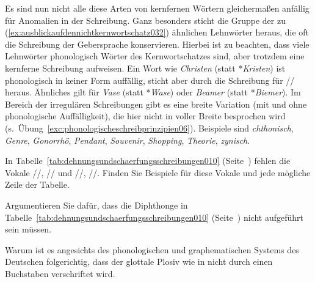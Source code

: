 Es sind nun nicht alle diese Arten von kernfernen Wörtern gleichermaßen anfällig für Anomalien in der Schreibung.
Ganz besonders sticht die Gruppe der zu (\ref{ex:ausblickaufdennichtkernwortschatz032}) ähnlichen Lehnwörter heraus, die oft die Schreibung der Gebersprache konservieren.
Hierbei ist zu beachten, dass viele Lehnwörter phonologisch Wörter des Kernwortschatzes sind, aber trotzdem eine kernferne Schreibung aufweisen.
Ein Wort wie \textit{Christen} (statt *\textit{Kristen}) ist phonologisch in keiner Form auffällig, sticht aber durch die Schreibung \textipa{[chr]} für // heraus.
Ähnliches gilt für \textit{Vase} (statt *\textit{Wase}) oder \textit{Beamer} (statt *\textit{Biemer}).
Im Bereich der irregulären Schreibungen gibt es eine breite Variation (mit und ohne phonologische Auffälligkeit), die hier nicht in voller Breite besprochen wird (s.\ Übung~\ref{exc:phonologischeschreibprinzipien06}).
Beispiele sind \textit{chthonisch}, \textit{Genre}, \textit{Gonorrhö}, \textit{Pendant}, \textit{Souvenir}, \textit{Shopping}, \textit{Theorie}, \textit{zynisch}.


\Uebungen

 \label{exc:phonologischeschreibprinzipien01} In Tabelle~\ref{tab:dehnungsundschaerfungsschreibungen010} (Seite~\pageref{tab:dehnungsundschaerfungsschreibungen010}) fehlen die Vokale //, // und /\textipa{\o}/, /\textipa{\oe}/.
Finden Sie Beispiele für diese Vokale und jede mögliche Zeile der Tabelle.

 \label{exc:phonologischeschreibprinzipien02} Argumentieren Sie dafür, dass die Diphthonge in Tabelle~\ref{tab:dehnungsundschaerfungsschreibungen010} (Seite~\pageref{tab:dehnungsundschaerfungsschreibungen010}) nicht aufgeführt sein müssen.

 \label{exc:phonologischeschreibprinzipien03} Warum ist es angesichts des phonologischen und graphematischen Systems des Deutschen folgerichtig, dass der glottale Plosiv wie in \textipa{[PEnd@]} nicht durch einen Buchstaben verschriftet wird.

